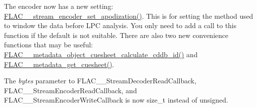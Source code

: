 The encoder now has a new setting\+: \mbox{\hyperlink{group__flac__stream__encoder_ga83d38fd6fca7abbf8363bdc2536a299e}{F\+L\+A\+C\+\_\+\+\_\+stream\+\_\+encoder\+\_\+set\+\_\+apodization()}}. This is for setting the method used to window the data before L\+PC analysis. You only need to add a call to this function if the default is not suitable. There are also two new convenience functions that may be useful\+: \mbox{\hyperlink{group__flac__metadata__object_ga897138ca0a985d8741f73d6657f38845}{F\+L\+A\+C\+\_\+\+\_\+metadata\+\_\+object\+\_\+cuesheet\+\_\+calculate\+\_\+cddb\+\_\+id()}} and \mbox{\hyperlink{group__flac__metadata__level0_ga6ee2633dc179c2a0cb5fef5762faf0fd}{F\+L\+A\+C\+\_\+\+\_\+metadata\+\_\+get\+\_\+cuesheet()}}.

The {\itshape bytes} parameter to F\+L\+A\+C\+\_\+\+\_\+\+Stream\+Decoder\+Read\+Callback, F\+L\+A\+C\+\_\+\+\_\+\+Stream\+Encoder\+Read\+Callback, and F\+L\+A\+C\+\_\+\+\_\+\+Stream\+Encoder\+Write\+Callback is now {\ttfamily size\+\_\+t} instead of {\ttfamily unsigned}. 